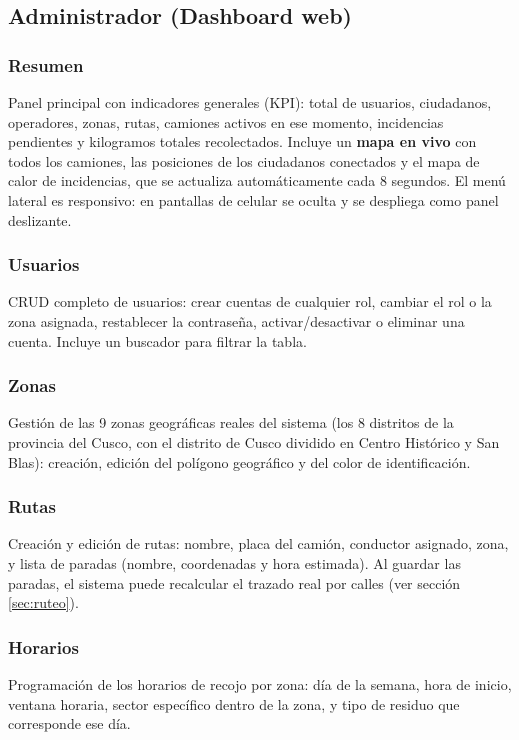 \documentclass[11pt,a4paper]{article}
\begin{document}
\subsection{Administrador (Dashboard web)}

\subsubsection{Resumen}
Panel principal con indicadores generales (KPI): total de usuarios, ciudadanos, operadores, zonas, rutas, camiones activos en ese momento, incidencias pendientes y kilogramos totales recolectados. Incluye un \textbf{mapa en vivo} con todos los camiones, las posiciones de los ciudadanos conectados y el mapa de calor de incidencias, que se actualiza automáticamente cada 8 segundos. El menú lateral es responsivo: en pantallas de celular se oculta y se despliega como panel deslizante.

\subsubsection{Usuarios}
CRUD completo de usuarios: crear cuentas de cualquier rol, cambiar el rol o la zona asignada, restablecer la contraseña, activar/desactivar o eliminar una cuenta. Incluye un buscador para filtrar la tabla.

\subsubsection{Zonas}
Gestión de las 9 zonas geográficas reales del sistema (los 8 distritos de la provincia del Cusco, con el distrito de Cusco dividido en Centro Histórico y San Blas): creación, edición del polígono geográfico y del color de identificación.

\subsubsection{Rutas}
Creación y edición de rutas: nombre, placa del camión, conductor asignado, zona, y lista de paradas (nombre, coordenadas y hora estimada). Al guardar las paradas, el sistema puede recalcular el trazado real por calles (ver sección \ref{sec:ruteo}).

\subsubsection{Horarios}
Programación de los horarios de recojo por zona: día de la semana, hora de inicio, ventana horaria, sector específico dentro de la zona, y tipo de residuo que corresponde ese día.
\end{document}
